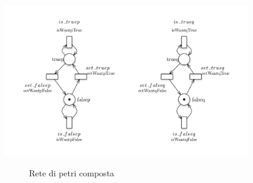 \documentclass[a4paper]{article}
\begin{document}
\begin{center}
{}
\includegraphics[width=0.8\textwidth]{variables.png}
\end{center}
\newpage
\begin{figure}[!ht]
\centering
{}
\caption{Rete di petri composta} \label{FIG:3.8PN}
\end{figure}
\newpage
\end{document}

